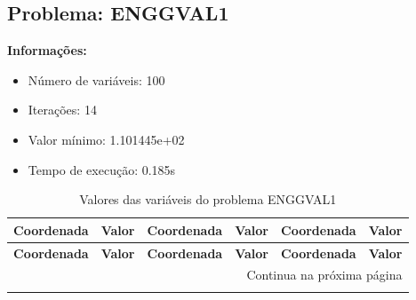 \documentclass[12pt]{article}
\begin{document}
\newpage            
\subsection{Problema: ENGGVAL1}

\textbf{Informações:}
\begin{itemize}
\item Número de variáveis: 100
\item Iterações: 14
\item Valor mínimo: 1.101445e+02
\item Tempo de execução: 0.185s
\end{itemize}

\small
\begin{longtable}{@{}cc|cc|cc@{}}
\caption{Valores das variáveis do problema ENGGVAL1} \\
\toprule
\textbf{Coordenada} & \textbf{Valor} & \textbf{Coordenada} & \textbf{Valor} & \textbf{Coordenada} & \textbf{Valor} \\
\midrule
\endfirsthead

\toprule
\textbf{Coordenada} & \textbf{Valor} & \textbf{Coordenada} & \textbf{Valor} & \textbf{Coordenada} & \textbf{Valor} \\
\midrule
\endhead

\midrule \multicolumn{6}{r}{{Continua na próxima página}} \\ \midrule
\endfoot


\end{longtable}
\end{document}
